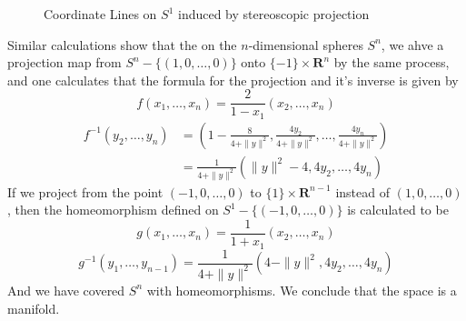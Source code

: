 \begin{example}
\begin{figure}
\begin{center}
    \end{center}
    \caption{Coordinate Lines on $S^1$ induced by stereoscopic projection}
    \end{figure}
    Similar calculations show that the on the $n$-dimensional spheres $S^n$, we ahve a projection map from $S^n - \{ (1,0,\dots,0) \}$ onto $\{ -1 \} \times \mathbf{R}^n$ by the same process, and one calculates that the formula for the projection and it's inverse is given by
    \[ f(x_1, \dots, x_n) = \frac{2}{1 - x_1}(x_2, \dots, x_n) \]
    \begin{align*}
        f^{-1}(y_2, \dots, y_n) &= \left(1 - \frac{8}{4 + \| y \|^2}, \frac{4y_2}{4 + \| y \|^2}, \dots, \frac{4y_n}{4 + \| y \|^2} \right)\\
        &= \frac{1}{4 + \| y \|^2} \left( \| y \|^2 - 4, 4y_2, \dots, 4y_n \right)
    \end{align*}
    If we project from the point $(-1,0,\dots,0)$ to $\{ 1 \} \times \mathbf{R}^{n-1}$ instead of $(1,0,\dots,0)$, then the homeomorphism defined on $S^1 - \{ (-1,0,\dots,0) \}$ is calculated to be
    \[ g(x_1, \dots, x_n) = \frac{1}{1 + x_1}(x_2, \dots, x_n) \]
    \[ g^{-1}(y_1, \dots, y_{n-1}) = \frac{1}{4 + \| y \|^2} \left( 4 - \| y \|^2, 4y_2, \dots, 4y_n \right) \]
    And we have covered $S^n$ with homeomorphisms. We conclude that the space is a manifold.
\end{example}

